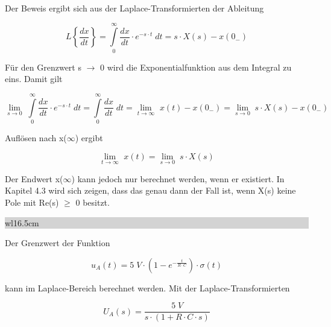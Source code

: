 \noindent Der Beweis ergibt sich aus der Laplace-Transformierten der Ableitung

\begin{equation}\label{eq:fourhundred}
L\left\{\frac{dx}{dt} \right\}=\int\limits _{0}^{\infty }\frac{dx}{dt}  \cdot e^{-s\cdot t} \;dt=s\cdot X\left(s\right)-x\left(0_{-} \right)
\end{equation}

\noindent Für den Grenzwert s $\rightarrow$ 0 wird die Exponentialfunktion aus dem Integral zu eins. Damit gilt

\begin{equation}\label{eq:fourhundredone}
\lim\limits_{s\to 0} \;\int\limits _{0}^{\infty }\frac{dx}{dt}  \cdot e^{-s\cdot t} \;dt=\int\limits _{0}^{\infty }\frac{dx}{dt}  \;dt=\lim\limits_{t\to \infty } \, \, x\left(t\right)-x\left(0_{-} \right)=\lim\limits_{s\to 0} \;s\cdot X\left(s\right)-x\left(0_{-} \right)
\end{equation}

\noindent Auflösen nach x($\infty$) ergibt

\begin{equation}\label{eq:fourhundredtwo}
\lim\limits_{t\to \infty } \, \, x\left(t\right)=\lim \limits_{s\to 0}\;s\cdot X\left(s\right)
\end{equation}

\noindent Der Endwert x($\infty$) kann jedoch nur berechnet werden, wenn er existiert. In Kapitel 4.3 wird sich zeigen, dass das genau dann der Fall ist, wenn X(s) keine Pole mit Re(s) $\geq$ 0 besitzt.\bigskip

\noindent
\colorbox{lightgray}{%
%
\renewcommand\arraystretch{0.6}%
\begin{tabular}{ wl{16.5cm} }
{\selectfont{Beispiel: Endwertsatz}}
\end{tabular}%
}\bigskip

\noindent Der Grenzwert der Funktion 

\begin{equation}\label{eq:fourhundredthree}
u_{A} \left(t\right)=5\; V\cdot \left(1-e^{-\frac{t}{R\cdot C} } \right)\cdot \sigma \left(t\right)
\end{equation}

\noindent kann im Laplace-Bereich berechnet werden. Mit der Laplace-Transformierten

\begin{equation}\label{eq:fourhundredfour}
U_{A} \left(s\right)=\frac{5\;V}{s\cdot \left(1+R\cdot C\cdot s\right)} 
\end{equation}

